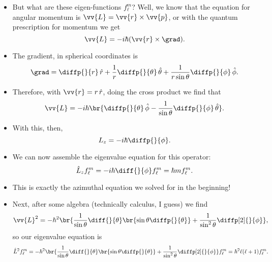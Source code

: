 \begin{itemize}
    \item But what are these eigen-functions $f_{\ell}^m$? Well, we know that the equation for angular momentum is $\vv{L} = \vv{r} \times \vv{p}$, or with the quantum prescription for momentum we get
        \begin{equation}
            \vv{L} = -i\hbar (\vv{r} \times \grad).
        \end{equation}
    \item The gradient, in spherical coordinates is
        \begin{equation}
            \grad = \diffp{}{r}\,\hat{r} + \frac{1}{r}\diffp{}{\theta}\,\hat{\theta} + \frac{1}{r\sin\theta}\diffp{}{\phi}\,\hat{\phi}.
        \end{equation}
    \item Therefore, with $\vv{r} = r\,\hat{r}$, doing the cross product we find that
        \begin{equation}
            \vv{L} = -i\hbar\br{\diffp{}{\theta}\,\hat{\phi} - \frac{1}{\sin\theta}\diffp{}{\phi}\,\hat{\theta}}.
        \end{equation}
    \item With this, then,
        \begin{equation}
            L_z = -i\hbar \diffp{}{\phi}.
        \end{equation}
    \item We can now assemble the eigenvalue equation for this operator:
        \begin{equation}
            \hat{L}_z f_{\ell}^m = -i\hbar \diff{}{\phi}f_{\ell}^m = \hbar m f_{\ell}^m.
        \end{equation}
    \item This is exactly the azimuthal equation we solved for in the beginning! 
    \item Next, after some algebra (technically calculus, I guess) we find
        \begin{equation}
            \vv{L}^2 = -\hbar^2 \br{\frac{1}{\sin\theta}\diff{}{\theta}\br{\sin\theta \diffp{}{\theta}} +\frac{1}{\sin^2\theta}\diffp[2]{}{\phi}},
        \end{equation}
        so our eigenvalue equation is
        \begin{equation}
            \hat{L}^2 f_{\ell}^m = -\hbar^2 \br{\frac{1}{\sin\theta}\diff{}{\theta}\br{\sin\theta \diffp{}{\theta}} +\frac{1}{\sin^2\theta}\diffp[2]{}{\phi}}f_{\ell}^m = \hbar^2 \ell(\ell+1) f_{\ell}^m.
        \end{equation}

\end{itemize}
